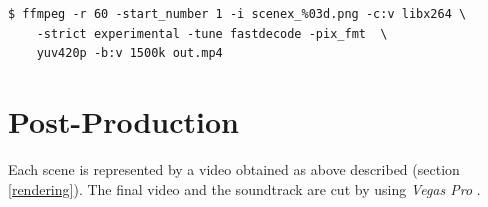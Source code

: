 \begin{lstlisting}
$ ffmpeg -r 60 -start_number 1 -i scenex_%03d.png -c:v libx264 \
	-strict experimental -tune fastdecode -pix_fmt  \
	yuv420p -b:v 1500k out.mp4

\end{lstlisting}

\section{Post-Production}
Each scene is represented by a video obtained as above described (section \ref{rendering}). The final video and the soundtrack are cut by using \textit{Vegas Pro} \cite{VegasPro}.
